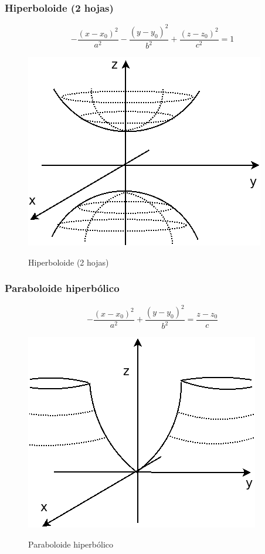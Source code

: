 \documentclass{article}
\begin{document}
\subsubsection{Hiperboloide (2 hojas)}

\begin{equation}
-\frac{(x-x_0)^2}{a^2} - \frac{(y-y_0)^2}{b^2} + \frac{(z-z_0)^2}{c^2} = 1
\end{equation}

\begin{figure}[t]
\caption{Hiperboloide (2 hojas)}
\includegraphics[scale=0.75]{img/pra_fig004_hiperboloide2.png} 
\centering
\label{fig:hiperboloide2}
\end{figure}

\subsubsection{Paraboloide hiperbólico}

\begin{equation}
-\frac{(x-x_0)^2}{a^2} + \frac{(y-y_0)^2}{b^2} = \frac{z-z_0}{c}
\end{equation}

\begin{figure}[t]
\caption{Paraboloide hiperbólico}
\includegraphics[scale=0.75]{img/pra_fig005_paraboloide_h.png} 
\centering
\label{fig:paraboloide_h}
\end{figure}
\end{document}
